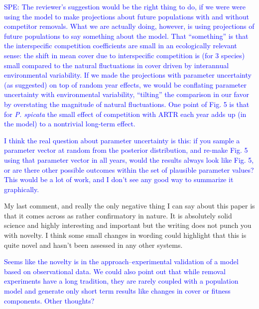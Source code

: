 \documentclass[12pt]{article}
\newcommand{\response}{\textcolor{blue}}
\begin{document}
{\response{SPE: The reviewer's suggestion would be the right thing to do, if we were were using the model to make projections about future populations with and without competitor removals. What we are
actually doing, however, is using projections of future populations to say something about the model. That ``something'' is that the interspecific competition coefficients are small in an ecologically
relevant sense: the shift in mean cover due to interspecific competition is (for 3 species) small compared to the natural fluctuations in cover driven by interannual environmental variability. 
If we made the projections with parameter uncertainty (as suggested) on top of random year effects, we would be conflating parameter uncertainty with environmental variability, ``tilting'' the
comparison in our favor by overstating the magnitude of natural fluctuations. One point of Fig. 5 is that for \emph{P. spicata} the small effect of competition with ARTR each year adds up (in the model)
to a nontrivial long-term effect.}

\response{I think the real question about parameter uncertainty is this: if you sample a parameter vector at random from the posterior distribution, and re-make Fig. 5 using that parameter vector
in all years, would the results always look like Fig. 5, or are there other possible outcomes within the set of plausible parameter values? This would be a lot of work, and I don't see any good way to
summarize it graphically. } 
 
My last comment, and really the only negative thing I can say about this paper is that it comes across as rather confirmatory in nature. It is absolutely solid science and 
highly interesting and important but the writing does not punch you with novelty. I think some small changes in wording could highlight that this is quite novel and hasn't 
been assessed in any other systems. 

\response{Seems like the novelty is in the approach--experimental validation of a model based on observational data. We could also point out that while 
removal experiments have a long tradition, they are rarely coupled with a population model and generate only short term results like changes in cover or 
fitness components. Other thoughts?}

}
\end{document}
